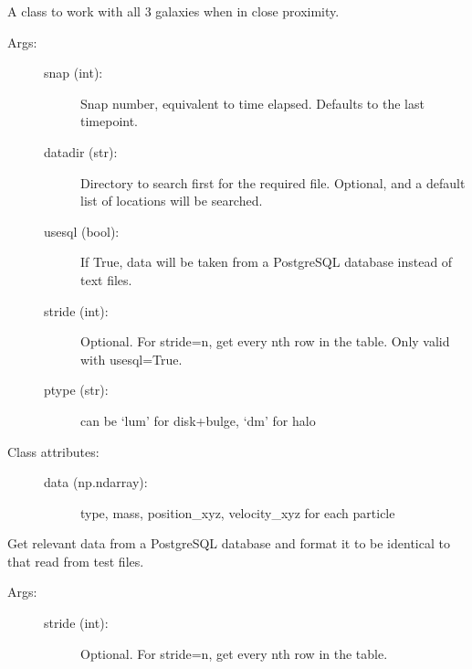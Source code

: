 \documentclass[letterpaper,10pt,english]{sphinxmanual}
\begin{document}
\begin{fulllineitems}
\label{\detokenize{approaches:galaxy.approaches.Approaches}}
A class to work with all 3 galaxies when in close proximity.
\begin{description}
\item[{Args:}] \leavevmode\begin{description}
\item[{snap (int):}] \leavevmode
Snap number, equivalent to time elapsed. 
Defaults to the last timepoint.

\item[{datadir (str):}] \leavevmode
Directory to search first for the required file. Optional, and a
default list of locations will be searched.

\item[{usesql (bool):}] \leavevmode
If True, data will be taken from a PostgreSQL database instead of
text files.

\item[{stride (int):}] \leavevmode
Optional. For stride=n, get every nth row in the table.
Only valid with usesql=True.

\item[{ptype (str):}] \leavevmode
can be ‘lum’ for disk+bulge, ‘dm’ for halo

\end{description}

\item[{Class attributes:}] \leavevmode\begin{description}
\item[{data (np.ndarray):}] \leavevmode
type, mass, position\_xyz, velocity\_xyz for each particle

\end{description}

\end{description}

\begin{fulllineitems}
\label{\detokenize{approaches:galaxy.approaches.Approaches.read_db}}
Get relevant data from a PostgreSQL database and format it to be 
identical to that read from test files.
\begin{description}
\item[{Args:}] \leavevmode\begin{description}
\item[{stride (int):}] \leavevmode
Optional. For stride=n, get every nth row in the table.


\end{description}
\end{description}
\end{fulllineitems}
\end{fulllineitems}
\end{document}
